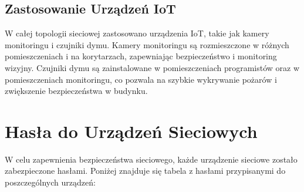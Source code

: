 \subsection{Zastosowanie Urządzeń IoT}
W całej topologii sieciowej zastosowano urządzenia IoT, takie jak kamery monitoringu i czujniki dymu. Kamery monitoringu są rozmieszczone w różnych pomieszczeniach i na korytarzach, zapewniając bezpieczeństwo i monitoring wizyjny. Czujniki dymu są zainstalowane w pomieszczeniach programistów oraz w pomieszczeniach monitoringu, co pozwala na szybkie wykrywanie pożarów i zwiększenie bezpieczeństwa w budynku.

\section{Hasła do Urządzeń Sieciowych}
W celu zapewnienia bezpieczeństwa sieciowego, każde urządzenie sieciowe zostało zabezpieczone hasłami. Poniżej znajduje się tabela z hasłami przypisanymi do poszczególnych urządzeń:

